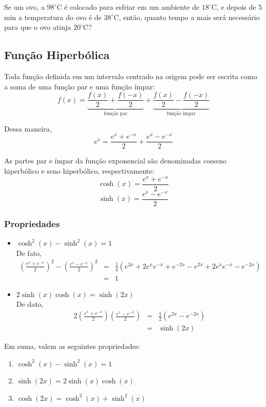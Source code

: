 \documentclass[oneside,a4paper,12pt]{article}
\begin{document}
Se um ovo, a $98^{\circ}$C é colocado para esfriar em um ambiente de $18^{\circ}$C, e depois de $5$min a temperatura do ovo é de $38^{\circ}$C, então, quanto tempo a mais será necessário para que o ovo atinja $20^{\circ}$C?

\newpage

\subsection{Função Hiperbólica}

Toda função definida em um intervalo centrado na origem pode ser escrita como a soma de uma função par e uma função ímpar:
$$f(x) = \underbrace{\frac{f(x)}{2} + \frac{f(-x)}{2}}_{\text{função par}} + \underbrace{\frac{f(x)}{2} - \frac{f(-x)}{2}}_{\text{função ímpar}}$$

Dessa maneira,
$$e^x = \frac{e^x + e^{-x}}{2} + \frac{e^x - e^{-x}}{2}$$

As partes par e ímpar da função exponencial são denominadas cosseno hiperbólico e seno hiperbólico, respectivamente:
$$\cosh(x) = \frac{e^x + e^{-x}}{2}$$
$$\sinh(x) = \frac{e^x - e^{-x}}{2}$$

\subsubsection{Propriedades}
\begin{itemize}
	\item $\cosh^{2}(x) - \sinh^{2}(x) = 1$ \\
	De fato, 
	\begin{eqnarray*}
	\left( \frac{e^x + e^{-x}}{2} \right)^2 - \left( \frac{e^x - e^{-x}}{2} \right)^2 & = & \frac{1}{4}(e^{2x} + 2e^x e^{-x} + e^{-2x} - e^{2x} + 2e^x e^{-x} - e^{-2x}) \\
	& = & 1
	\end{eqnarray*}
	\item $2\sinh(x)\cosh(x) = \sinh(2x)$ \\
	De dato,
	\begin{eqnarray*}
	2 \left( \frac{e^x + e^{-x}}{2} \right) \left( \frac{e^x - e^{-x}}{2} \right) & = & \frac{1}{2}(e^{2x} - e^{-2x}) \\
	& = & \sinh(2x)
	\end{eqnarray*}
\end{itemize}

Em suma, valem as seguintes propriedades:
\begin{enumerate}
	\item $\cosh^2(x) - \sinh^2(x) = 1$ 
	\item $\sinh(2x) = 2\sinh(x)\cosh(x)$
	\item $\cosh(2x) = \cosh^2(x) + \sinh^2(x)$
\end{enumerate}
\end{document}

